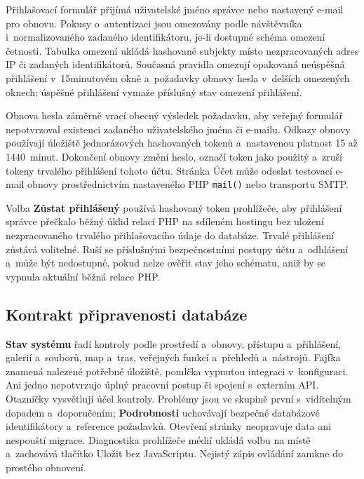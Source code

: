\documentclass[11pt,a4paper]{article}
\newcommand{\ui}[1]{\textbf{#1}}
\newcommand{\codeword}[1]{\nolinkurl{#1}}
\begin{document}
Přihlašovací formulář přijímá uživatelské jméno správce nebo nastavený e-mail
pro obnovu. Pokusy o~autentizaci jsou omezovány podle návštěvníka
i~normalizovaného zadaného identifikátoru, je-li dostupné schéma omezení
četnosti. Tabulka omezení ukládá hashované subjekty místo nezpracovaných adres
IP či zadaných identifikátorů. Současná pravidla omezují opakovaná neúspěšná
přihlášení v~15minutovém okně a~požadavky obnovy hesla v~delších omezených
oknech; úspěšné přihlášení vymaže příslušný stav omezení přihlášení.

Obnova hesla záměrně vrací obecný výsledek požadavku, aby veřejný formulář
nepotvrzoval existenci zadaného uživatelského jména či e-mailu. Odkazy obnovy
používají úložiště jednorázových hashovaných tokenů a~nastavenou platnost 15 až
1440~minut. Dokončení obnovy změní heslo, označí token jako použitý a~zruší
tokeny trvalého přihlášení tohoto účtu. Stránka Účet může odeslat testovací
e-mail obnovy prostřednictvím nastaveného PHP \codeword{mail()} nebo transportu
SMTP.

Volba \ui{Zůstat přihlášený} používá hashovaný token prohlížeče, aby přihlášení
správce přečkalo běžný úklid relací PHP na sdíleném hostingu bez uložení
nezpracovaného trvalého přihlašovacího údaje do databáze. Trvalé přihlášení
zůstává volitelné. Ruší se příslušnými bezpečnostními postupy účtu a~odhlášení
a~může být nedostupné, pokud nelze ověřit stav jeho schématu, aniž by se vypnula
aktuální běžná relace PHP.
\subsection{Kontrakt připravenosti databáze}
\label{sec:db-readiness-contract}

\ui{Stav systému} řadí kontroly podle prostředí a~obnovy, přístupu a~přihlášení,
galerií a~souborů, map a~tras, veřejných funkcí a~přehledů a~nástrojů.
Fajfka znamená nalezené potřebné úložiště, pomlčka vypnutou integraci
v~konfiguraci. Ani jedno nepotvrzuje úplný pracovní postup či spojení s~externím
API. Otazníčky vysvětlují účel kontroly. Problémy jsou ve skupině první
s~viditelným dopadem a~doporučením; \ui{Podrobnosti} uchovávají bezpečné
databázové
identifikátory a~reference požadavků. Otevření stránky neopravuje data ani
nespouští migrace. Diagnostika prohlížeče médií ukládá volbu na místě
a~zachovává
tlačítko Uložit bez JavaScriptu. Nejistý zápis ovládání zamkne do prostého
obnovení.
\end{document}
